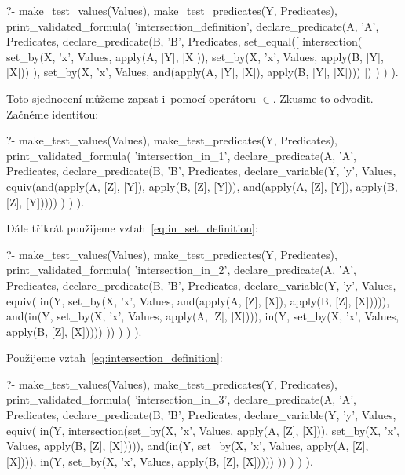 \begin{prolog}
?- 	make_test_values(Values),
	make_test_predicates(Y, Predicates),
	print_validated_formula(
		'intersection_definition',
		declare_predicate(A, 'A', Predicates,
			declare_predicate(B, 'B', Predicates,
				set_equal([
					intersection(
						set_by(X, 'x', Values, apply(A, [Y], [X])),
						set_by(X, 'x', Values, apply(B, [Y], [X]))
					),
					set_by(X, 'x', Values, and(apply(A, [Y], [X]), apply(B, [Y], [X])))
				])
			)
		)
	).
\end{prolog}

Toto sjednocení můžeme zapsat i~pomocí operátoru \(\in\). Zkusme to odvodit. Začněme identitou:
\begin{prolog}
?- 	make_test_values(Values),
	make_test_predicates(Y, Predicates),
	print_validated_formula(
		'intersection_in_1',
		declare_predicate(A, 'A', Predicates,
			declare_predicate(B, 'B', Predicates,
				declare_variable(Y, 'y', Values, equiv(and(apply(A, [Z], [Y]), apply(B, [Z], [Y])), and(apply(A, [Z], [Y]), apply(B, [Z], [Y]))))
			)
		)
	).
\end{prolog}

Dále třikrát použijeme vztah~\eqref{eq:in_set_definition}:
\begin{prolog}
?- 	make_test_values(Values),
	make_test_predicates(Y, Predicates),
	print_validated_formula(
		'intersection_in_2',
		declare_predicate(A, 'A', Predicates,
			declare_predicate(B, 'B', Predicates,
				declare_variable(Y, 'y', Values, equiv(
					in(Y, set_by(X, 'x', Values, and(apply(A, [Z], [X]), apply(B, [Z], [X])))),
					and(in(Y, set_by(X, 'x', Values, apply(A, [Z], [X]))), in(Y, set_by(X, 'x', Values, apply(B, [Z], [X]))))
				))
			)
		)
	).
\end{prolog}

Použijeme vztah~\eqref{eq:intersection_definition}:
\begin{prolog}
?- 	make_test_values(Values),
	make_test_predicates(Y, Predicates),
	print_validated_formula(
		'intersection_in_3',
		declare_predicate(A, 'A', Predicates,
			declare_predicate(B, 'B', Predicates,
				declare_variable(Y, 'y', Values, equiv(
					in(Y, intersection(set_by(X, 'x', Values, apply(A, [Z], [X])), set_by(X, 'x', Values, apply(B, [Z], [X])))),
					and(in(Y, set_by(X, 'x', Values, apply(A, [Z], [X]))), in(Y, set_by(X, 'x', Values, apply(B, [Z], [X]))))
				))
			)
		)
	).
\end{prolog}

